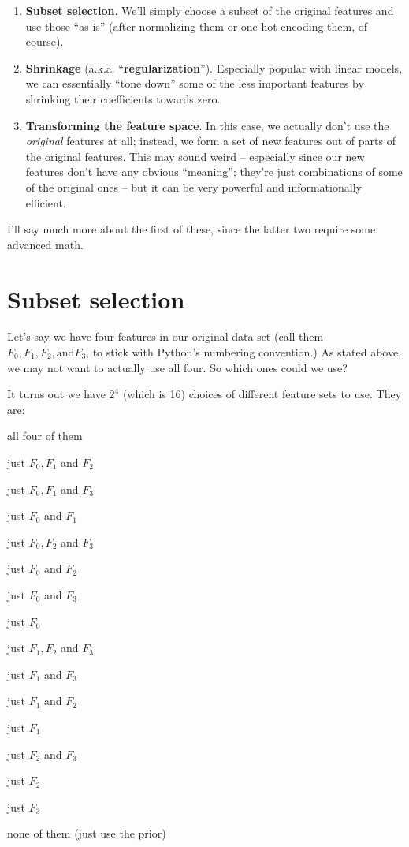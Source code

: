 \begin{enumerate}
\itemsep.1em


\item \textbf{Subset selection}. We'll simply choose a subset of the original
features and use those ``as is'' (after normalizing them or one-hot-encoding
them, of course).


\item \textbf{Shrinkage} (a.k.a. ``\textbf{regularization}''). Especially
popular with linear models, we can essentially ``tone down'' some of the less
important features by shrinking their coefficients towards zero.

\item \textbf{Transforming the feature space}. In this case, we actually don't
use the \textit{original} features at all; instead, we form a set of
new features out of parts of the original features. This may sound weird --
especially since our new features don't have any obvious ``meaning''; they're
just combinations of some of the original ones -- but it can be very powerful
and informationally efficient.

\end{enumerate}

I'll say much more about the first of these, since the latter two require some
advanced math.

\section{Subset selection}

Let's say we have four features in our original data set (call them
$F_0,F_1,F_2, \textrm{and} F_3$, to stick with Python's numbering
convention.) As stated above, we may not want to actually use all four. So
which ones could we use?

It turns out we have $2^4$ (which is 16) choices of different feature sets to
use. They are:

\begin{compactitem}
\item all four of them
\item just $F_0,F_1$ and $F_2$
\item just $F_0,F_1$ and $F_3$
\item just $F_0$ and $F_1$
\item just $F_0,F_2$ and $F_3$
\item just $F_0$ and $F_2$
\item just $F_0$ and $F_3$
\item just $F_0$
\item just $F_1,F_2$ and $F_3$
\item just $F_1$ and $F_3$
\item just $F_1$ and $F_2$
\item just $F_1$
\item just $F_2$ and $F_3$
\item just $F_2$
\item just $F_3$
\item none of them (just use the prior)
\end{compactitem}

